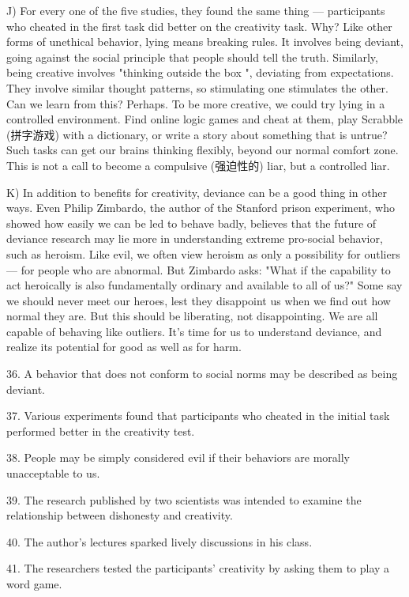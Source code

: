 \documentclass[UTF8,11pt]{ctexart}
\begin{document}
J) For every one of the five studies, they found the same thing — participants who cheated in the first task did better on the creativity task. Why? Like other forms of unethical behavior, lying means breaking rules. It involves being deviant, going against the social principle that people should tell the truth. Similarly, being creative involves "thinking outside the box ", deviating from expectations. They involve similar thought patterns, so stimulating one stimulates the other. Can we learn from this? Perhaps. To be more creative, we could try lying in a controlled environment. Find online logic games and cheat at them, play Scrabble (拼字游戏) with a dictionary, or write a story about something that is untrue? Such tasks can get our brains thinking flexibly, beyond our normal comfort zone. This is not a call to become a compulsive (强迫性的) liar, but a controlled liar.


K) In addition to benefits for creativity, deviance can be a good thing in other ways. Even Philip Zimbardo, the author of the Stanford prison experiment, who showed how easily we can be led to behave badly, believes that the future of deviance research may lie more in understanding extreme pro-social behavior, such as heroism. Like evil, we often view heroism as only a possibility for outliers — for people who are abnormal. But Zimbardo asks: "What if the capability to act heroically is also fundamentally ordinary and available to all of us?" Some say we should never meet our heroes, lest they disappoint us when we find out how normal they are. But this should be liberating, not disappointing. We are all capable of behaving like outliers. It's time for us to understand deviance, and realize its potential for good as well as for harm.


36. A behavior that does not conform to social norms may be described as being deviant.


37. Various experiments found that participants who cheated in the initial task performed better in the creativity test.


38. People may be simply considered evil if their behaviors are morally unacceptable to us.


39. The research published by two scientists was intended to examine the relationship between dishonesty and creativity.


40. The author's lectures sparked lively discussions in his class.


41. The researchers tested the participants' creativity by asking them to play a word game.
\end{document}
